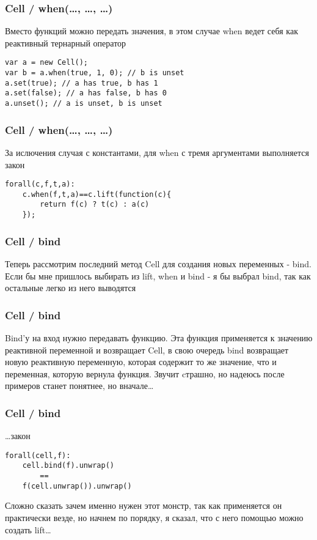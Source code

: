 \documentclass[xetex]{beamer}
\begin{document}
\begin{frame}[fragile]
\frametitle{Cell / when(\dots, \dots, \dots)}
Вместо функций можно передать значения, в этом случае when ведет себя как реактивный тернарный оператор

\vspace{10mm}
\begin{lstlisting}
var a = new Cell();
var b = a.when(true, 1, 0); // b is unset
a.set(true); // a has true, b has 1
a.set(false); // a has false, b has 0
a.unset(); // a is unset, b is unset
\end{lstlisting}
\end{frame}


\begin{frame}[fragile]
\frametitle{Cell / when(\dots, \dots, \dots)}
За ислючения случая с константами, для when с тремя аргументами выполняется закон

\vspace{10mm}
\begin{lstlisting}
forall(c,f,t,a):
    c.when(f,t,a)==c.lift(function(c){ 
        return f(c) ? t(c) : a(c) 
    });
\end{lstlisting}
\end{frame}


\begin{frame}[fragile]
\frametitle{Cell / bind}
Теперь рассмотрим последний метод Cell для создания новых переменных - bind. Если бы мне пришлось выбирать из lift, when и bind - я бы выбрал bind, так как остальные легко из него выводятся
\end{frame}


\begin{frame}[fragile]
\frametitle{Cell / bind}
Bind’у на вход нужно передавать функцию. Эта функция применяется к значению реактивной переменной и возвращает Cell, в свою очередь bind возвращает новую реактивную переменную, которая содержит то же значение, что и переменная, которую вернула функция. Звучит cтрашно, но надеюсь после примеров станет понятнее, но вначале\dots
\end{frame}


\begin{frame}[fragile]
\frametitle{Cell / bind}
\dots{}закон

\vspace{6mm}
\begin{lstlisting}
forall(cell,f):
    cell.bind(f).unwrap() 
        == 
    f(cell.unwrap()).unwrap()
\end{lstlisting}
\vspace{6mm}

Сложно сказать зачем именно нужен этот монстр, так как применяется он практически везде, но начнем по порядку, я сказал, что с него помощью можно создать lift\dots
\end{frame}
\end{document}
